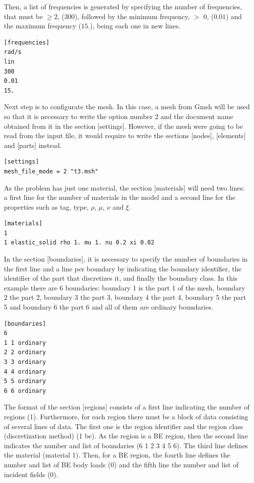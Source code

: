 \documentclass[a4]{article}
\begin{document}
Then, a list of frequencies is generated by specifying the number of frequencies, that must be $\geq 2$, (300), followed by the minimum frequency, $>$ 0, ($0.01$) and the maximum frequency ($15.$), being each one in new lines.

\begin{Verbatim}
[frequencies]
rad/s
lin
300
0.01
15.
\end{Verbatim}

Next step is to configurate the mesh. In this case, a mesh from Gmsh will be used so that it is necessary to write the option number 2 and the document name obtained from it in the section [settings]. However, if the mesh were going to be read from the input file, it would require to write the sections [nodes], [elements] and [parts] instead.

\begin{Verbatim}	
[settings]
mesh_file_mode = 2 "t3.msh"
\end{Verbatim}

As the problem has just one material, the section [materials] will need two lines: a first line for the number of materials in the model and a second line for the properties such as tag, type, $\rho$, $\mu$, $\nu$ and $\xi$.

\begin{Verbatim}	
[materials]
1
1 elastic_solid rho 1. mu 1. nu 0.2 xi 0.02
\end{Verbatim}

In the section [boundaries], it is necessary to specify the number of boundaries in the first line and a line per boundary by indicating the boundary identifier, the identifier of the part that discretizes it, and finally the boundary class. In this example there are 6 boundaries: boundary 1 is the part 1 of the mesh, boundary 2 the part 2, boundary 3 the part 3, boundary 4 the part 4, boundary 5 the part 5 and boundary 6 the part 6 and all of them are ordinary boundaries.

\begin{Verbatim}	
[boundaries]
6
1 1 ordinary
2 2 ordinary
3 3 ordinary
4 4 ordinary
5 5 ordinary
6 6 ordinary
\end{Verbatim}

The format of the section [regions] consists of a first line indicating the number of regions (1). Furthermore, for each region there must be a block of data consisting of several lines of data. The first one is the region identifier and the region class (discretization method) (1 be). As the region is a BE region, then the second line indicates the number and list of boundaries (6 1 2 3 4 5 6). The third line defines the material (material 1). Then, for a BE region, the fourth line defines the number and list of BE body loads (0) and the fifth line the number and list of incident fields (0).
\end{document}
